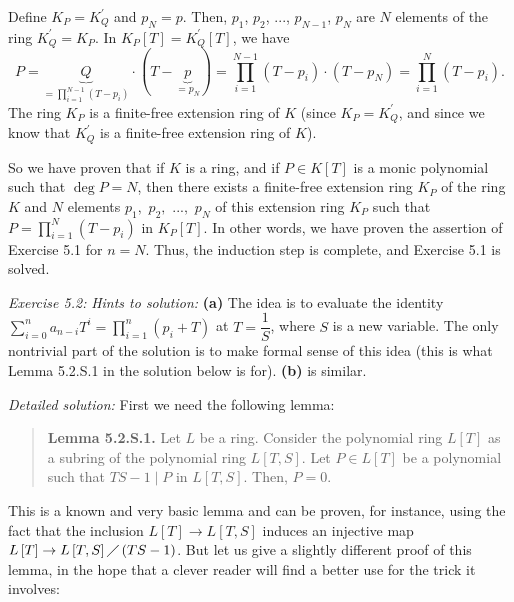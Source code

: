 \documentclass[numbers=enddot,12pt,final,onecolumn,notitlepage]{scrartcl}%
\begin{document}
Define $K_{P}=K_{Q}^{\prime}$ and $p_{N}=p$. Then, $p_{1}$, $p_{2}$, $...$,
$p_{N-1}$, $p_{N}$ are $N$ elements of the ring $K_{Q}^{\prime}=K_{P}$. In
$K_{P}\left[  T\right]  =K_{Q}^{\prime}\left[  T\right]  $, we have%
\[
P=\underbrace{Q}_{=\prod\limits_{i=1}^{N-1}\left(  T-p_{i}\right)  }%
\cdot\left(  T-\underbrace{p}_{=p_{N}}\right)  =\prod\limits_{i=1}%
^{N-1}\left(  T-p_{i}\right)  \cdot\left(  T-p_{N}\right)  =\prod
\limits_{i=1}^{N}\left(  T-p_{i}\right)  .
\]
The ring $K_{P}$ is a finite-free extension ring of $K$ (since $K_{P}%
=K_{Q}^{\prime}$, and since we know that $K_{Q}^{\prime}$ is a finite-free
extension ring of $K$).

So we have proven that if $K$ is a ring, and if $P\in K\left[  T\right]  $ is
a monic polynomial such that $\deg P=N$, then there exists a finite-free
extension ring $K_{P}$ of the ring $K$ and $N$ elements $p_{1},$ $p_{2},$
$...,$ $p_{N}$ of this extension ring $K_{P}$ such that $P=\prod
\limits_{i=1}^{N}\left(  T-p_{i}\right)  $ in $K_{P}\left[  T\right]  $. In
other words, we have proven the assertion of Exercise 5.1 for $n=N$. Thus, the
induction step is complete, and Exercise 5.1 is solved.

\textit{Exercise 5.2:} \textit{Hints to solution:} \textbf{(a)} The idea is to
evaluate the identity $\sum\limits_{i=0}^{n}a_{n-i}T^{i}=\prod\limits_{i=1}%
^{n}\left(  p_{i}+T\right)  $ at $T=\dfrac{1}{S}$, where $S$ is a new
variable. The only nontrivial part of the solution is to make formal sense of
this idea (this is what Lemma 5.2.S.1 in the solution below is for).
\textbf{(b)} is similar.

\textit{Detailed solution:} First we need the following lemma:

\begin{quote}
\textbf{Lemma 5.2.S.1.} Let $L$ be a ring. Consider the polynomial ring
$L\left[  T\right]  $ as a subring of the polynomial ring $L\left[
T,S\right]  $. Let $P\in L\left[  T\right]  $ be a polynomial such that
$TS-1\mid P$ in $L\left[  T,S\right]  $. Then, $P=0$.
\end{quote}

This is a known and very basic lemma and can be proven, for instance, using
the fact that the inclusion $L\left[  T\right]  \rightarrow L\left[
T,S\right]  $ induces an injective map $L\left[  T\right]  \rightarrow
L\left[  T,S\right]  \diagup\left(  TS-1\right)  $. But let us give a slightly
different proof of this lemma, in the hope that a clever reader will find a
better use for the trick it involves:
\end{document}
